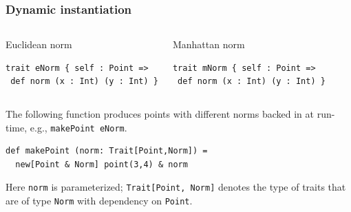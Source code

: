 \documentclass{beamer}
\begin{document}
\begin{frame}[fragile]
  \frametitle{Dynamic instantiation}

  \begin{columns}[t]


\begin{exampleblock}{Euclidean norm}

\begin{lstlisting}
trait eNorm { self : Point =>
 def norm (x : Int) (y : Int) }
\end{lstlisting}


\end{exampleblock}


\begin{exampleblock}{Manhattan norm}

\begin{lstlisting}
trait mNorm { self : Point =>
 def norm (x : Int) (y : Int) }
\end{lstlisting}

\end{exampleblock}

  \end{columns}

\vskip10pt

\pause

The following function produces points with different norms backed in at
run-time, e.g., \lstinline{makePoint eNorm}.

  \begin{exampleblock}{}
\begin{lstlisting}
def makePoint (norm: Trait[Point,Norm]) =
  new[Point & Norm] point(3,4) & norm
\end{lstlisting}
  \end{exampleblock}

  \pause

  Here \lstinline{norm} is parameterized; \lstinline{Trait[Point, Norm]} denotes
  the type of traits that are of type \lstinline{Norm} with dependency on
  \lstinline{Point}.

\end{frame}
\end{document}
